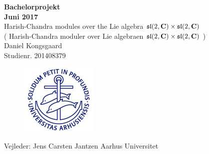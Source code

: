 \hypersetup{pageanchor=false}
\begin{titlingpage}
  \centering
  {\Huge\bfseries Bachelorprojekt} \\[1.5em]
  {\huge\bfseries Juni 2017} \\[2.5em]
  {\Huge Harish-Chandra modules over the Lie algebra $\mathfrak{sl}(2,\mathbf{C})\times \mathfrak{sl}(2,\mathbf{C})$} \\[1.5em]
  {\huge ( Harish-Chandra moduler over Lie algebraen $\mathfrak{sl}(2,\mathbf{C})\times \mathfrak{sl}(2,\mathbf{C})$ )} \\[2.5em]
  {\huge Daniel Kongsgaard} \\[1.5em]
  {\huge Studienr. 201408379}
  \vfill
  \begin{figure}[!h]
    \centering
    \includegraphics{AUlogo.jpg}
  \end{figure}
  \vfill
  {\huge Vejleder: Jens Carsten Jantzen}
  \vfill
  {\Large Aarhus Universitet}
\end{titlingpage}
\hypersetup{pageanchor=true}

